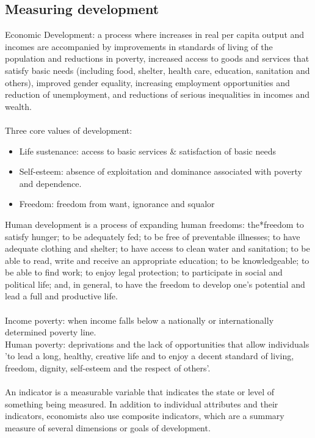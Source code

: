 \subsection{Measuring development}
Economic Development: a process where increases in real per capita output and incomes are accompanied by improvements in standards of living of the population and reductions in poverty, increased access to goods and services that satisfy basic needs (including food, shelter, health care, education, sanitation and others), improved gender equality, increasing employment opportunities and reduction of unemployment, and reductions of serious inequalities in incomes and wealth.\\\\
Three core values of development:
\begin{itemize}
  \item Life sustenance: access to basic services \& satisfaction of basic needs
  \item Self-esteem: absence of exploitation and dominance associated with poverty and dependence.
  \item Freedom: freedom from want, ignorance and squalor
\end{itemize}
Human development is a process of expanding human freedoms: the*freedom to satisfy hunger; to be adequately fed; to be free of preventable illnesses; to have adequate clothing and shelter; to have access to clean water and sanitation; to be able to read, write and receive an appropriate education; to be knowledgeable; to be able to find work; to enjoy legal protection; to participate in social and political life; and, in general, to have the freedom to develop one's potential and lead a full and productive life.\\\\
Income poverty: when income falls below a nationally or internationally determined poverty line.\\
Human poverty: deprivations and the lack of opportunities that allow individuals 'to lead a long, healthy, creative life and to enjoy a decent standard of living, freedom, dignity, self-esteem and the respect of others'.\\\\
An indicator is a measurable variable that indicates the state or level of something being measured. In addition to individual attributes and their indicators, economists also use composite indicators, which are a summary measure of several dimensions or goals of development. \\\\
